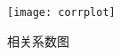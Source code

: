 
% 


\begin{figure}[!ht]
  \centering
  \texttt{[image: corrplot]}
  \caption{相关系数图} \label{corrplot}
  \end{figure}

